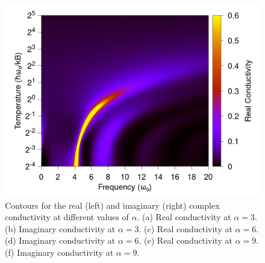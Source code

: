 \begin{figure}[t]
    \includegraphics[width=.49\textwidth]{figures/frohlich-3d-real-conductivity-alpha-6-temp-00625to32-freq-0to30-contourf.png}

    \caption{Contours for the real (left) and imaginary (right) complex conductivity at different values of $\alpha$. (a) Real conductivity at $\alpha = 3$. (b) Imaginary conductivity at $\alpha = 3$. (c) Real conductivity at $\alpha = 6$. (d) Imaginary conductivity at $\alpha = 6$. (e) Real conductivity at $\alpha = 9$. (f) Imaginary conductivity at $\alpha = 9$.}
    \label{fig:osakacontour}
\end{figure}

